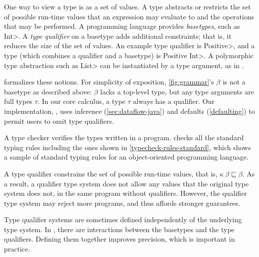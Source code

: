 One way to view a type is as
a set of values.  A type abstracts or restricts the
set of possible run-time values that an expression may evaluate to
and the operations that may be performed.
A programming language provides \emph{basetypes}, such as \<Int>.
A \textit{type qualifier} on a basetype adds additional constraints;
that is, it reduces the size of the set of values.
An example type qualifier is \<Positive>, and a type (which combines a qualifier
and a basetype) is \<Positive Int>.
A polymorphic type abstraction such as \<List> can be instantiated by a type argument,
as in .

 formalizes these notions.
For simplicity of exposition,
\cref{fig:grammar}'s $\beta$ is not a basetype as described above:  $\beta$
lacks a top-level type, but any type arguments are full types
$\tau$.
In our core calculus, a type $\tau$ always has a qualifier.
Our implementation, \theDeterminismChecker, uses inference (\cref{sec:dataflow-java}) and
defaults (\cref{defaulting}) to
permit users to omit type qualifiers.


A type checker verifies the types written in a program.
\OurTypeSystem checks all the standard typing rules including the ones
shown in \cref{typecheck-rules-standard}, which
shows a sample of standard typing rules for
an object-oriented programming language.

A type qualifier constrains the set of possible run-time values, that is,
$\kappa \ \beta \sqsubseteq \beta$.
As a result, a qualifier type system does not allow any values that the
original type system does not, in the same program without qualifiers.
However, the qualifier type system may reject more programs, and thus
affords stronger guarantees.

Type qualifier systems are sometimes defined independently of the
underlying type system.  In \ourTypeSystem, there are interactions between the
basetypes and the type qualifiers.  Defining them together improves
precision, which is important in practice.


